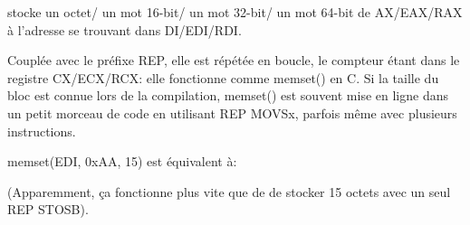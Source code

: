 \item[STOSB/STOSW/STOSD/STOSQ] stocke un octet/
un mot 16-bit/
un mot 32-bit/
un mot 64-bit de AX/EAX/RAX à l'adresse se trouvant dans DI/EDI/RDI.

\label{REP_STOSx}
Couplée avec le préfixe REP, elle est répétée en boucle, le compteur étant dans le
registre CX/ECX/RCX:
elle fonctionne comme memset() en C.
Si la taille du bloc est connue lors de la compilation, memset() est souvent mise
en ligne dans un petit morceau de code en utilisant REP MOVSx, parfois même avec
plusieurs instructions.

memset(EDI, 0xAA, 15) est équivalent à:



(Apparemment, ça fonctionne plus vite que de de stocker 15 octets avec un seul REP STOSB).
